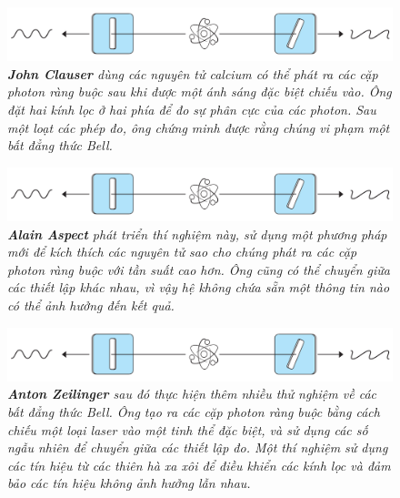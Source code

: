 \begin{multicols}{2}
\begin{figure}[H]
		\centering
		\captionsetup{labelformat= empty, justification=centering}
		\includegraphics[width= 1\linewidth]{4}
		\caption{\small\textit{\color{timhieukhoahoc}\textbf{\color{timhieukhoahoc}John Clauser} dùng các nguyên tử calcium có thể phát ra các cặp photon ràng buộc sau khi được một ánh sáng đặc biệt chiếu vào. Ông đặt hai kính lọc ở hai phía để đo sự phân cực của các photon. Sau một loạt các phép đo, ông chứng minh được rằng chúng vi phạm một bất đẳng thức Bell.}}
		\vspace*{-10pt}
	\end{figure}
	\begin{figure}[H]
		\vspace*{-5pt}
		\centering
		\captionsetup{labelformat= empty, justification=centering}
		\includegraphics[width= 1\linewidth]{4}
		\caption{\small\textit{\color{timhieukhoahoc}\textbf{\color{timhieukhoahoc}Alain Aspect} phát triển thí nghiệm này, sử dụng một phương pháp mới để kích thích các nguyên tử sao cho chúng phát ra các cặp photon ràng buộc với tần suất cao hơn. Ông cũng có thể chuyển giữa các thiết lập khác nhau, vì vậy hệ không chứa sẵn một thông tin nào có thể ảnh hưởng đến kết quả.}}
		\vspace*{-10pt}
	\end{figure}
	\begin{figure}[H]
		\vspace*{-5pt}
		\centering
		\captionsetup{labelformat= empty, justification=centering}
		\includegraphics[width= 1\linewidth]{4}
		\caption{\small\textit{\color{timhieukhoahoc}\textbf{\color{timhieukhoahoc}Anton Zeilinger} sau đó thực hiện thêm nhiều thử nghiệm về các bất đẳng thức Bell. Ông tạo ra các cặp photon ràng buộc bằng cách chiếu một loại laser vào một tinh thể đặc biệt, và sử dụng các số ngẫu nhiên để chuyển giữa các thiết lập đo. Một thí nghiệm sử dụng các tín hiệu từ các thiên hà xa xôi để điều khiển các kính lọc và đảm bảo các tín hiệu không ảnh hưởng lẫn nhau.}}

\end{figure}
\end{multicols}
